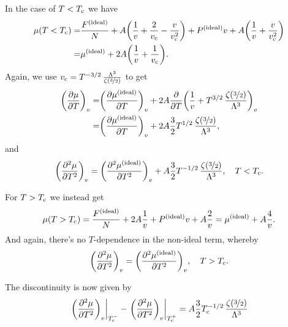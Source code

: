 \documentclass[11pt,letter, swedish, english
]{article}
\begin{document}
In the case of $T<T_{\text{c}}$ we have
\begin{equation}
\begin{aligned}
\mu(T<T_{\text{c}})=&\frac{F^\text{{(ideal)}}}{N}
+A\qty(\frac{1}{v}+\frac{2}{v_{\text{c}}}-\frac{v}{v_{\text{c}}^2})
+P^\text{{(ideal)}}v+A\qty(\frac{1}{v}+\frac{v}{v_{\text{c}}^2})\\
=&\mu^\text{{(ideal)}}
+2A\qty(\frac{1}{v}+\frac{1}{v_{\text{c}}}).
\end{aligned}
\end{equation}
Again, we use
$v_{\text{c}}=T^{-3/2}\,\frac{\Lambda^3}{\zeta(\nicefrac{3}{2})}$
to get
\begin{equation}
\begin{aligned}
\qty(\pdv{\mu}{T})_v=&\qty(\pdv{\mu^\text{{(ideal)}}}{T})_v
+2A\pdv{T}\qty(\frac{1}{v}+
T^{3/2}\,\frac{\zeta(\nicefrac{3}{2})}{\Lambda^3})_v\\
=&\qty(\pdv{\mu^\text{{(ideal)}}}{T})_v
+2A\frac{3}{2}
T^{1/2}\,\frac{\zeta(\nicefrac{3}{2})}{\Lambda^3},
\end{aligned}
\end{equation}
and
\begin{equation}
\qty(\pdv[2]{\mu}{T})_v
=\qty(\pdv[2]{\ideal{\mu}}{T})_v
+A\frac{3}{2}
T^{-1/2}\,\frac{\zeta(\nicefrac{3}{2})}{\Lambda^3}
\qcomma T<\Tc.
\end{equation}

For $T>T_{\text{c}}$ we instead get
\begin{equation}
\mu(T>T_{\text{c}})=\frac{F^\text{{(ideal)}}}{N}+2A\frac{1}{v}
+P^\text{{(ideal)}}v+A\frac{2}{v}
=\mu^\text{{(ideal)}}+A\frac{4}{v}.
\end{equation}
And again, there's no $T$-dependence in the non-ideal term, whereby 
\begin{equation}
\qty(\pdv[2]{\mu}{T})_v
=\qty(\pdv[2]{\ideal{\mu}}{T})_v
\qcomma T>\Tc.
\end{equation}

The discontinuity is now given by
\begin{equation}\label{eq:3_discont._mu}
\eval{\qty(\pdv[2]{\mu}{T})_v}_{\Tc^-}
-\eval{\qty(\pdv[2]{\mu}{T})_v}_{\Tc^+}
=A\frac{3}{2}
\Tc^{-1/2}\,\frac{\zeta(\nicefrac{3}{2})}{\Lambda^3}
\end{equation}
\end{document}
